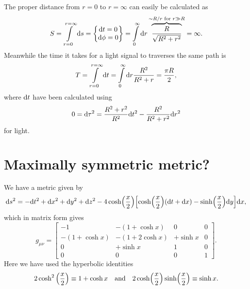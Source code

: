 \documentclass[11pt,a4paper, 
swedish, english %
]{article}
\begin{document}
The proper distance from $r=0$ to $r=\infty$ can easily be calculated
as
\begin{equation}
S=\int_{r=0}^{r=\infty}\rd{s}=
\begin{Bmatrix}
\rd{t}=0\\
\rd{\phi}=0
\end{Bmatrix}
=\int_0^\infty\rd{r}
\overbrace{\frac{R}{\sqrt{R^2+r^2}}}^{\sim R/r\text{ for }r\gg R}
 =\infty.
\end{equation}
Meanwhile the time it takes for a light signal to traverses the same
path is
\begin{equation}
T=\int_{r=0}^{r=\infty}\rd{t}
=\int_0^\infty\rd{r}\frac{R^2}{R^2+r}
=\frac{\pi R}{2},
\end{equation}
where $\mathrm{d}{t}$ have been calculated using
\begin{equation}
0=\mathrm{d}{\tau^2}=\frac{R^2+r^2}{R^2}\mathrm{d}{t}^2
-\frac{R^2}{R^2+r^2}\mathrm{d}{r}^2
\end{equation}
for light.



\section{Maximally symmetric metric?}
We have a metric given by
\begin{equation}\label{eq10:ds}
\mathrm{d}{s}^2=-\mathrm{d}{t}^2+\mathrm{d}{x}^2+\mathrm{d}{y}^2+\mathrm{d}{z}^2
-4\cosh(\frac{x}{2})
\qty[\cosh(\frac{x}{2})(\mathrm{d}{t}+\mathrm{d}{x})-\sinh(\frac{x}{2})\mathrm{d}{y}]\mathrm{d}{x},
\end{equation}
which in matrix form gives
\begin{equation}
g_{\mu\nu}=
\begin{bmatrix}
-1 & -(1+\cosh x) &0 &0\\
-(1+\cosh x) &-(1+2\cosh x) &+\sinh x&0\\
0&+\sinh x &1&0\\
0&0&0&1
\end{bmatrix}.
\end{equation}
Here we have used the hyperbolic identities
\begin{equation}
2\cosh^2\qty(\frac{x}{2})\equiv 1+\cosh x
\qand
2\cosh(\frac{x}{2})\sinh(\frac{x}{2})
\equiv \sinh x.
\end{equation}
\end{document}
